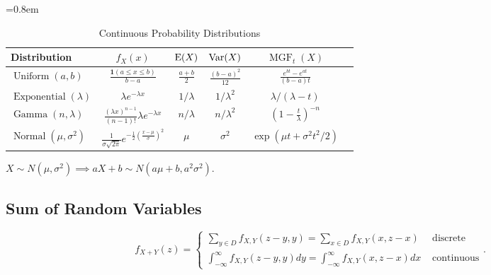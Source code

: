 \documentclass[a4paper, 12pt, fleqn]{article}
\DeclareMathOperator{\MGF}{MGF}
\begin{document}
\begin{table}[!ht]
\centering
\caption{Continuous Probability Distributions}
=0.8em
\abovetopsep=4pt
\begin{tabular}{lccccc}
\toprule Distribution
    & $f_X(x)$
    & $\operatorname*{E}(X)$
    & $\operatorname*{Var}(X)$
    & $\MGF_t(X)$
\\ \midrule $\operatorname{Uniform}(a, b)$
    & $\displaystyle \frac{\mathbf{1}(a \le x \le b)}{b-a}$
    & $\displaystyle \frac{a+b}{2}$
    & $\displaystyle \frac{(b-a)^2}{12}$
    & $\displaystyle \frac{e^{bt} - e^{at}}{(b-a)t}$
\\[\defaultaddspace] $\operatorname{Exponential}(\lambda)$
    & $\lambda e^{-\lambda x}$
    & $1/\lambda$
    & $1/\lambda^2$
    & $\lambda/(\lambda - t)$
\\[\defaultaddspace] $\operatorname{Gamma}(n, \lambda)$
    & $\displaystyle \frac{(\lambda x)^{n-1}}{(n-1)!} \lambda e^{-\lambda x}$
    & $n/\lambda$
    & $n/\lambda^2$
    & $\displaystyle \left(1-\frac{t}{\lambda}\right)^{-n}$
\\[\defaultaddspace] $\operatorname{Normal}(\mu, \sigma^2)$
    & $\displaystyle \frac{1}{\sigma\sqrt{2\pi}}e^{-\frac{1}{2}\left(\frac{x-\mu}{\sigma}\right)^2}$
    & $\mu$
    & $\sigma^2$
    & $\exp(\mu t + \sigma^2t^2/2)$
\\ \bottomrule
\end{tabular}
\label{table:cont-distr}
\end{table}

\begin{theorem}
$X \sim N(\mu, \sigma^2) \implies aX + b \sim N(a\mu + b, a^2\sigma^2)$.
\end{theorem}

\subsection{Sum of Random Variables}

\begin{theorem}[Convolution]
\[ f_{X+Y}(z) = \begin{cases}
\displaystyle \sum_{y \in D} f_{X, Y}(z - y, y) = \sum_{x \in D} f_{X, Y}(x, z-x)
    & \textrm{ discrete}
\\[1.2em] \displaystyle
\int_{-\infty}^{\infty} f_{X, Y}(z - y, y) dy = \int_{-\infty}^{\infty} f_{X, Y}(x, z-x) dx
    & \textrm{ continuous}
\end{cases}. \]
\end{theorem}
\end{document}
